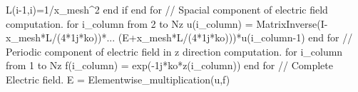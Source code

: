 \documentclass[a4paper]{article}
\begin{document}
{		\indent\indent L(i-1,i)=1/x\_mesh\string^2\newline
		\indent end if\newline
		end for\newline\newline	
		\textcolor{OliveGreen}{// Spacial component of electric field computation.}\newline
		for i\_column from 2 to Nz\newline
		\indent u(i\_column) = MatrixInverse(I-x\_mesh*L/(4*1j*ko))*...\newline
		\indent\indent\indent\indent\indent\indent\indent\indent\indent\indent\indent(E+x\_mesh*L/(4*1j*ko)))*u(i\_column-1)\newline
		end for\newline\newline
		\textcolor{OliveGreen}{// Periodic component of electric field in z direction computation.}\newline
		for i\_column from 1 to Nz\newline
		\indent f(i\_column) = exp(-1j*ko*z(i\_column))\newline
		end for\newline\newline
		\textcolor{OliveGreen}{// Complete Electric field.}\newline
		E = Elementwise\_multiplication(u,f)\newline\newline
	    }
		\newpage

	
		
\end{document}
